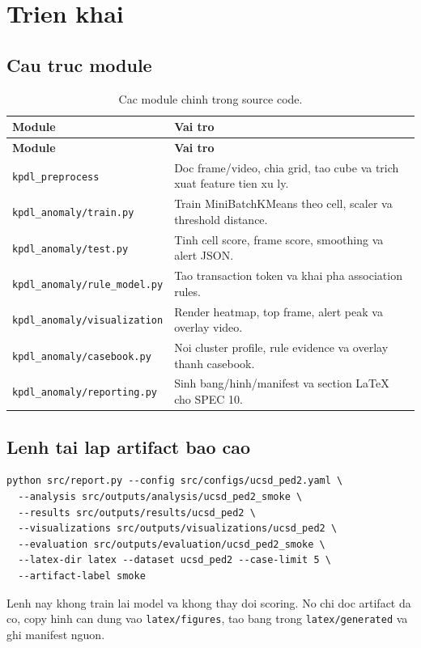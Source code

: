 \chapter{Trien khai}

\section{Cau truc module}

\begin{longtable}{@{}p{}p{}@{}}
\caption{Cac module chinh trong source code.}\\
\textbf{Module} & \textbf{Vai tro}\\
\hline
\endfirsthead
\textbf{Module} & \textbf{Vai tro}\\
\hline
\endhead
\texttt{kpdl\_preprocess} & Doc frame/video, chia grid, tao cube va trich xuat feature tien xu ly.\\
\texttt{kpdl\_anomaly/train.py} & Train MiniBatchKMeans theo cell, scaler va threshold distance.\\
\texttt{kpdl\_anomaly/test.py} & Tinh cell score, frame score, smoothing va alert JSON.\\
\texttt{kpdl\_anomaly/rule\_model.py} & Tao transaction token va khai pha association rules.\\
\texttt{kpdl\_anomaly/visualization} & Render heatmap, top frame, alert peak va overlay video.\\
\texttt{kpdl\_anomaly/casebook.py} & Noi cluster profile, rule evidence va overlay thanh casebook.\\
\texttt{kpdl\_anomaly/reporting.py} & Sinh bang/hinh/manifest va section LaTeX cho SPEC 10.\\
\end{longtable}

\section{Lenh tai lap artifact bao cao}

\begin{verbatim}
python src/report.py --config src/configs/ucsd_ped2.yaml \
  --analysis src/outputs/analysis/ucsd_ped2_smoke \
  --results src/outputs/results/ucsd_ped2 \
  --visualizations src/outputs/visualizations/ucsd_ped2 \
  --evaluation src/outputs/evaluation/ucsd_ped2_smoke \
  --latex-dir latex --dataset ucsd_ped2 --case-limit 5 \
  --artifact-label smoke
\end{verbatim}

Lenh nay khong train lai model va khong thay doi scoring. No chi doc artifact da co, copy hinh can dung vao \texttt{latex/figures}, tao bang trong \texttt{latex/generated} va ghi manifest nguon.

